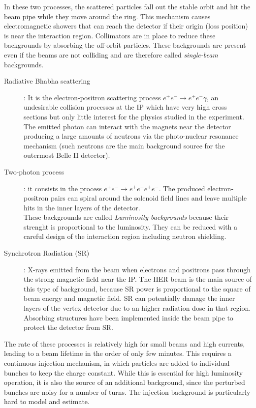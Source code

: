 In these two processes, the scattered particles fall out the stable orbit and hit the beam pipe while they move around the ring. This mechanism causes electromagnetic showers that can reach the detector if their origin (loss position) is near the interaction region. Collimators are in place to reduce these backgrounds by absorbing the off-orbit particles. These backgrounds are present even if the beams are not colliding and are therefore called \textit{single-beam} backgrounds.


\begin{description}
\item[Radiative Bhabha scattering]:
	It is the electron-positron scattering process $e^{+}e^{-} \rightarrow e^{+}e^{-} \gamma$, an undesirable collision processes at the IP which have very high cross sections but only little interest for the physics studied in the experiment.
	The emitted photon can interact with the magnets near the detector producing a large amounts of neutrons via the photo-nuclear resonance mechanism (such neutrons are the main background source for the outermost Belle II detector).\\
	
\item[Two-photon process]:
	it consists in the process $e^{+}e^{-} \rightarrow e^{+}e^{-}e^{+}e^{-} $. The produced electron-positron pairs can spiral around the solenoid field lines and leave multiple hits in the inner layers of the detector.\\
	
These backgrounds are called \textit{Luminosity backgrounds} because their strenght is proportional to the luminosity. They can be reduced with a careful design of the interaction region including neutron shielding.

\item[Synchrotron Radiation (SR)]:
	X-rays emitted from the beam when electrons and positrons pass through the strong magnetic field near the IP. The HER beam is the main source of this type of background, because SR power is proportional to the square of beam energy and magnetic field.
SR can potentially damage the inner layers of the vertex detector due to an higher radiation dose in that region. Absorbing structures have been implemented inside the beam pipe to protect the detector from SR.
\end{description}

The rate of these processes is relatively high for small beams and high currents, leading to a beam lifetime in the order of only few minutes. This requires a continuous injection mechanism, in which particles are added to individual bunches to keep the charge constant. While this is essential for high luminosity operation, it is also the source of an additional background, since the perturbed bunches are noisy for a number of turns. The injection background is particularly hard to model and estimate.

